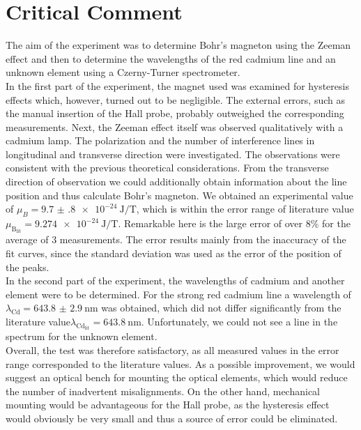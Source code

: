 \section{Critical Comment}
The aim of the experiment was to determine Bohr's magneton using the Zeeman effect and then to determine the wavelengths of the red cadmium line and an unknown element using a Czerny-Turner spectrometer.\\
In the first part of the experiment, the magnet used was examined for hysteresis effects which, however, turned out to be negligible.
The external errors, such as the manual insertion of the Hall probe, probably outweighed the corresponding measurements.
Next, the Zeeman effect itself was observed qualitatively with a cadmium lamp.
The polarization and the number of interference lines in longitudinal and transverse direction were investigated.
The observations were consistent with the previous theoretical considerations.
From the transverse direction of observation we could additionally obtain information about the line position and thus calculate Bohr's magneton.
We obtained an experimental value of $\mu_{B} = \SI{9.7(8)e-24}{\joule\per\tesla}$, which is within the error range of literature value\\ $\mu_{\text{B}_\text{lit}} = \SI{9.274e-24}{\joule\per\tesla}$.
Remarkable here is the large error of over 8\% for the average of 3 measurements.
The error results mainly from the inaccuracy of the fit curves, since the standard deviation was used as the error of the position of the peaks.\\
In the second part of the experiment, the wavelengths of cadmium and another element were to be determined. For the strong red cadmium line a wavelength of $\lambda_\text{Cd}= \SI{643.8(29)}{\nano\meter}$ was obtained, which did not differ significantly from the literature value$\lambda_{\text{Cd}_\text{lit}} = \SI{643.8}{\nano\meter}$.
Unfortunately, we could not see a line in the spectrum for the unknown element.\\
Overall, the test was therefore satisfactory, as all measured values in the error range corresponded to the literature values.
As a possible improvement, we would suggest an optical bench for mounting the optical elements, which would reduce the number of inadvertent misalignments.
On the other hand, mechanical mounting would be advantageous for the Hall probe, as the hysteresis effect would obviously be very small and thus a source of error could be eliminated.